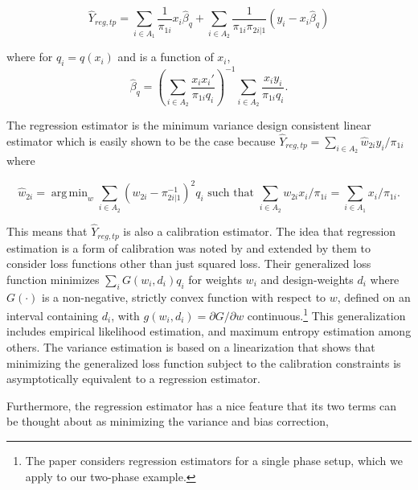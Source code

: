 \documentclass[12pt]{article}
\DeclareMathOperator*{\argmin}{arg\,min}
\begin{document}
$$ \hat Y_{reg, tp} 
= \sum_{i \in A_1} \frac{1}{\pi_{1i}} x_i \hat \beta_q+ \sum_{i \in A_2}
\frac{1}{\pi_{1i}\pi_{2i|1}} (y_i - x_i \hat \beta_q)$$

where for $q_i = q(x_i)$ and is a function of $x_i$,
$$
\hat \beta_q = \left(\sum_{i \in A_2} 
  \frac{x_i x_i'}{\pi_{1i} q_i}\right)^{-1} 
\sum_{i \in A_2} \frac{x_i y_i}{\pi_{1i} q_i}.$$ 

The regression estimator is the minimum variance design consistent linear
estimator which is easily shown to be the case because $\hat Y_{reg, tp} =
\sum_{i \in A_2} \hat w_{2i} y_i / \pi_{1i}$ where 

$$\hat w_{2i} = \argmin_{w} \sum_{i \in A_2} (w_{2i} - \pi_{2i|1}^{-1})^2 q_i \text{ such
that } \sum_{i \in A_2} w_{2i} x_i / \pi_{1i} = \sum_{i \in A_1} x_i / \pi_{1i}.$$

This means that $\hat Y_{reg, tp}$ is also a calibration estimator. The idea
that regression estimation is a form of calibration was noted by
\cite{deville1992calibration} and extended by them to consider loss functions
other than just squared loss. Their generalized loss function minimizes
$\sum_i G(w_i, d_i)q_i$ for weights $w_i$ and design-weights $d_i$ where
$G(\cdot)$ is a non-negative, strictly convex function with respect to $w$,
defined on an interval containing $d_i$, with $g(w_i, d_i) = \partial G /
\partial w$ continuous.\footnote{The \cite{deville1992calibration} paper
considers regression estimators for a single phase setup, which we apply to our
two-phase example.} This
generalization includes empirical likelihood estimation, and maximum entropy
estimation among others. The variance estimation is based on a linearization
that shows that minimizing the generalized loss function subject to the
calibration constraints is asymptotically equivalent to a regression estimator.

Furthermore, the regression estimator
has a nice feature that its two terms can be thought about as minimizing the
variance and bias correction,
\end{document}
